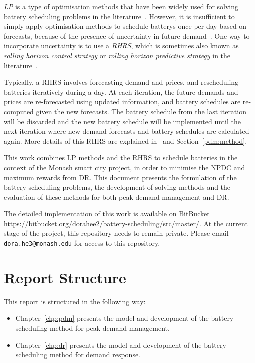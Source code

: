 \textit{\Gls{LP}} is a type of optimisation methods that have been widely used for solving battery scheduling problems in the literature~\cite{Marzband2017, Karimi2019, Li2019a, Couraud2020, Cuisinier2021}. 
However, it is insufficient to simply apply optimisation methods to schedule \glspl{battery} once per day based on forecasts, because of the presence of uncertainty in future demand~\cite{Marietta2014, Silvente2015, AEMO2020a}. One way to incorporate uncertainty is to use a \textit{\gls{RHRS}}, which is sometimes also known as \textit{rolling horizon control strategy} or \textit{rolling horizon predictive strategy} in the literature~\cite{Marietta2014, Silvente2015, Cuisinier2021, Baratsas2021}. 

Typically, a \gls{RHRS} involves forecasting demand and prices, and rescheduling batteries iteratively during a day. At each iteration, the future demands and prices are re-forecasted using updated information, and battery schedules are re-computed given the new forecasts. The battery schedule from the last iteration will be discarded and the new battery schedule will be implemented until the next iteration where new demand forecasts and battery schedules are calculated again. More details of this \gls{RHRS} are explained in~\cite{Marietta2014} and Section~\ref{pdm:method}.

This work combines \gls{LP} methods and the \gls{RHRS} to schedule batteries in the context of the Monash smart city project, in order to minimise the \gls{NPDC} and maximum rewards from \gls{DR}. This document presents the formulation of the battery scheduling problems, the development of solving methods and the evaluation of these methods for both peak demand management and \gls{DR}. 

The detailed implementation of this work is available on BitBucket \url{https://bitbucket.org/dorahee2/battery-scheduling/src/master/}. At the current stage of the project, this repository needs to remain private. Please email \texttt{dora.he3@monash.edu} for access to this repository.

\section{Report Structure}

This report is structured in the following way:

\begin{itemize}
	\item Chapter~\ref{chp:pdm} presents the model and development of the battery scheduling method for peak demand management. 
	
	\item Chapter~\ref{chp:dr} presents the model and development of the battery scheduling method for demand response. 
	
\end{itemize}